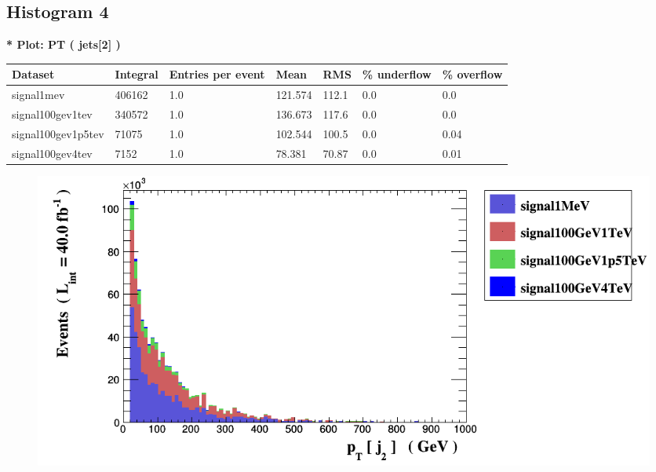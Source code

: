 \documentclass[a4paper, 10pt]{article}
\begin{document}
\subsection{ Histogram 4}

\textbf{* Plot: PT ( jets[2] ) }\\
   \begin{table}[H]
  \begin{center}
    \begin{tabular}{|m{23.0mm}|m{23.0mm}|m{18.0mm}|m{19.0mm}|m{19.0mm}|m{19.0mm}|m{19.0mm}|}
      \hline
      {\cellcolor{yellow}         Dataset}& {\cellcolor{yellow}         Integral}& {\cellcolor{yellow}         Entries per event}& {\cellcolor{yellow}         Mean}& {\cellcolor{yellow}         RMS}& {\cellcolor{yellow}         \% underflow}& {\cellcolor{yellow}         \% overflow}\\
      \hline
      {\cellcolor{white}         signal1mev}& {\cellcolor{white}         406162}& {\cellcolor{white}         1.0}& {\cellcolor{white}         121.574}& {\cellcolor{white}         112.1}& {\cellcolor{green}         0.0}& {\cellcolor{green}         0.0}\\
      \hline
      {\cellcolor{white}         signal100gev1tev}& {\cellcolor{white}         340572}& {\cellcolor{white}         1.0}& {\cellcolor{white}         136.673}& {\cellcolor{white}         117.6}& {\cellcolor{green}         0.0}& {\cellcolor{green}         0.0}\\
      \hline
      {\cellcolor{white}         signal100gev1p5tev}& {\cellcolor{white}         71075}& {\cellcolor{white}         1.0}& {\cellcolor{white}         102.544}& {\cellcolor{white}         100.5}& {\cellcolor{green}         0.0}& {\cellcolor{green}         0.04}\\
      \hline
      {\cellcolor{white}         signal100gev4tev}& {\cellcolor{white}         7152}& {\cellcolor{white}         1.0}& {\cellcolor{white}         78.381}& {\cellcolor{white}         70.87}& {\cellcolor{green}         0.0}& {\cellcolor{green}         0.01}\\
\hline
    \end{tabular}
  \end{center}
\end{table}

\begin{figure}[H]
  \begin{center}
    \includegraphics[scale=0.45]{selection_3.png}\\
\caption{   }
  \end{center}
\end{figure}
      \newpage
\end{document}
